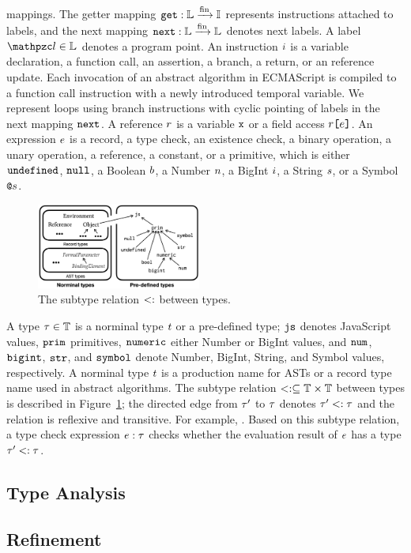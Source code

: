 mappings. The getter mapping $\texttt{get}: \mathbb{L} \xrightarrow{\text{fin}} \mathbb{I}$ represents
instructions attached to labels, and the next mapping $\texttt{next}: \mathbb{L} \xrightarrow{\text{fin}}
\mathbb{L}$ denotes next labels. A label $\lab \in \labset$ denotes a program
point.  An instruction $i$ is a variable declaration, a function call, an
assertion, a branch, a return, or an reference update.  Each invocation of an
abstract algorithm in ECMAScript is compiled to a function call instruction with
a newly introduced temporal variable.  We represent loops using branch
instructions with cyclic pointing of labels in the next mapping $\texttt{next}$.  A
reference $r$ is a variable $\texttt{x}$ or a field access $r \texttt{[} e
\texttt{]}$.  An expression $e$ is a record, a type check, an existence check, a
binary operation, a unary operation, a reference, a constant, or a primitive,
which is either $\texttt{undefined}$, $\texttt{null}$, a Boolean $b$, a Number $n$, a
BigInt $i$, a String $s$, or a Symbol $\texttt{@}s$.

\begin{figure}
  \centering
  \includegraphics[width=0.48\textwidth]{img/subtype}
  \vspace*{-1.5em}
  \caption{The subtype relation $<:$ between types.}
  \label{fig:subtype}
  \vspace*{-1.5em}
\end{figure}

A type $\tau \in \mathbb{T}$ is a norminal type $t$ or a pre-defined type;
$\texttt{js}$ denotes JavaScript values, $\texttt{prim}$ primitives, $\texttt{numeric}$ either Number
or BigInt values, and $\texttt{num}$, $\texttt{bigint}$, $\texttt{str}$, and $\texttt{symbol}$ denote Number,
BigInt, String, and Symbol values, respectively.  A norminal type $t$ is a
production name for ASTs or a record type name used in abstract algorithms.  The
subtype relation $<: \subseteq \mathbb{T} \times \mathbb{T}$ between types is
described in Figure~\ref{fig:subtype}; the directed edge from $\tau'$ to $\tau$
denotes $\tau' <: \tau$ and the relation is reflexive and transitive.  For
example, .  Based on
this subtype relation, a type check expression $e: \tau$ checks whether the
evaluation result of $e$ has a type $\tau' <: \tau$.  


\subsection{Type Analysis}\label{sec:analysis}

\subsection{Refinement}\label{sec:refine}
